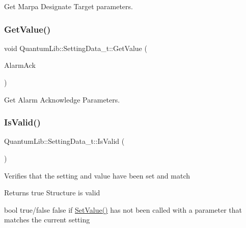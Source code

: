 Get Marpa Designate Target parameters. 

\mbox{\label{struct_quantum_lib_1_1_setting_data__t_a265ae2d7fc8ed10b8786e1df49d9a1ab}} 
\subsubsection{\texorpdfstring{Get\+Value()}{GetValue()}\hspace{0.1cm}{\footnotesize\ttfamily [26/26]}}
{\footnotesize\ttfamily void Quantum\+Lib\+::\+Setting\+Data\+\_\+t\+::\+Get\+Value (\begin{DoxyParamCaption}\item[{\mbox{\hyperlink{struct_quantum_lib_1_1_alarm_ack__t}{Alarm\+Ack\+\_\+t}} \&}]{Alarm\+Ack }\end{DoxyParamCaption})\hspace{0.3cm}{\ttfamily [inline]}}



Get Alarm Acknowledge Parameters. 

\mbox{\label{struct_quantum_lib_1_1_setting_data__t_a599520a391998e02c93c86211d5b9401}} 
\subsubsection{\texorpdfstring{Is\+Valid()}{IsValid()}}
{\footnotesize\ttfamily Quantum\+Lib\+::\+Setting\+Data\+\_\+t\+::\+Is\+Valid (\begin{DoxyParamCaption}{ }\end{DoxyParamCaption})\hspace{0.3cm}{\ttfamily [inline]}}

Verifies that the setting and value have been set and match \begin{DoxyReturn}{Returns}
true Structure is valid 

bool true/false false if \mbox{\hyperlink{struct_quantum_lib_1_1_setting_data__t_afbf4f07b95c1ef9d35bfdf8a362bd2e2}{Set\+Value()}} has not been called with a parameter that matches the current setting 
\end{DoxyReturn}
\mbox{\label{struct_quantum_lib_1_1_setting_data__t_afbf4f07b95c1ef9d35bfdf8a362bd2e2}} 
